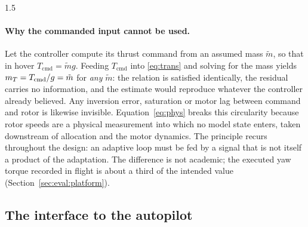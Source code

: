 \begin{spacing}{1.5}
\paragraph{Why the commanded input cannot be used.} Let the controller compute
its thrust command from an assumed mass $\tilde{m}$, so that in hover
$T_{\mathrm{cmd}} = \tilde{m} g$. Feeding $T_{\mathrm{cmd}}$ into
\eqref{eq:trans} and solving for the mass yields
$m_T = T_{\mathrm{cmd}} / g = \tilde{m}$ for \emph{any} $\tilde{m}$: the relation
is satisfied identically, the residual carries no information, and the estimate
would reproduce whatever the controller already believed. Any inversion error,
saturation or motor lag between command and rotor is likewise invisible.
Equation~\eqref{eq:phys} breaks this circularity because rotor speeds are a
physical measurement into which no model state enters, taken downstream of
allocation and the motor dynamics. The principle recurs throughout the design: an
adaptive loop must be fed by a signal that is not itself a product of the
adaptation. The difference is not academic; the executed yaw torque recorded in
flight is about a third of the intended value (Section~\ref{sec:eval:platform}).

\subsection{The interface to the autopilot}\label{sec:model:interface}


\end{spacing}
